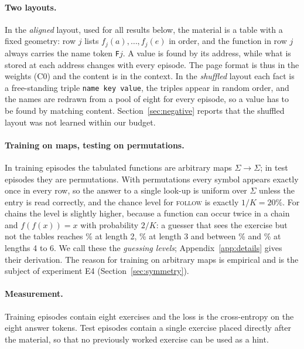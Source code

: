\documentclass[11pt]{article}
\newcommand{\tok}[1]{\texttt{#1}}
\newcommand{\skill}[1]{\textsc{#1}}
\begin{document}
\paragraph{Two layouts.}
In the \emph{aligned} layout, used for all results below, the material is a table with a fixed geometry: row $j$ lists $f_j(a), \dots, f_j(e)$ in order, and the function in row $j$ always carries the name token \tok{F}$j$.
A value is found by its address, while what is stored at each address changes with every episode.
The page format is thus in the weights (C0) and the content is in the context.
In the \emph{shuffled} layout each fact is a free-standing triple \tok{name key value}, the triples appear in random order, and the names are redrawn from a pool of eight for every episode, so a value has to be found by matching content.
Section~\ref{sec:negative} reports that the shuffled layout was not learned within our budget.

\paragraph{Training on maps, testing on permutations.}
In training episodes the tabulated functions are arbitrary maps $\Sigma \to \Sigma$; in test episodes they are permutations.
With permutations every symbol appears exactly once in every row, so the answer to a single look-up is uniform over $\Sigma$ unless the entry is read correctly, and the chance level for \skill{follow} is exactly $1/K = 20\%$.
For chains the level is slightly higher, because a function can occur twice in a chain and $f(f(x)) = x$ with probability $2/K$: a guesser that sees the exercise but not the tables reaches \GuessTwo\% at length 2, \GuessThree\% at length 3 and between \GuessFive\% and \GuessFour\% at lengths 4 to 6.
We call these the \emph{guessing levels}; Appendix~\ref{app:details} gives their derivation.
The reason for training on arbitrary maps is empirical and is the subject of experiment E4 (Section~\ref{sec:symmetry}).

\paragraph{Measurement.}
Training episodes contain eight exercises and the loss is the cross-entropy on the eight answer tokens.
Test episodes contain a single exercise placed directly after the material, so that no previously worked exercise can be used as a hint.


\end{document}

